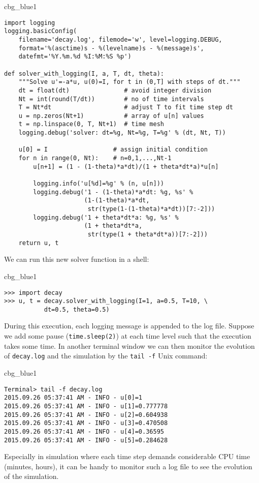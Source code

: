 \documentclass[graybox,sectrefs,envcountresetchap,open=right,final]{svmonodo}
\newenvironment{_cod_tight}[1]{
   \def\FrameCommand{\colorbox{#1}}
   \FrameRule0.6pt\MakeFramed {\FrameRestore}\vskip3mm}
   {\vskip0mm\endMakeFramed}
\newenvironment{cod}[1]{
\bgroup\rmfamily
\fboxsep=0mm\relax
\begin{_cod_tight}{#1}
\list{}{\parsep=-2mm\parskip=0mm\topsep=0pt\leftmargin=2mm
\rightmargin=2\leftmargin\leftmargin=4pt\relax}
\item\relax}
{\endlist\end{_cod_tight}\egroup}
\begin{document}
\begin{cod}{cbg_blue1}\begin{Verbatim}[numbers=none,fontsize=\fontsize{9pt}{9pt},baselinestretch=0.95,xleftmargin=2mm]
import logging
logging.basicConfig(
    filename='decay.log', filemode='w', level=logging.DEBUG,
    format='%(asctime)s - %(levelname)s - %(message)s',
    datefmt='%Y.%m.%d %I:%M:%S %p')

def solver_with_logging(I, a, T, dt, theta):
    """Solve u'=-a*u, u(0)=I, for t in (0,T] with steps of dt."""
    dt = float(dt)               # avoid integer division
    Nt = int(round(T/dt))        # no of time intervals
    T = Nt*dt                    # adjust T to fit time step dt
    u = np.zeros(Nt+1)           # array of u[n] values
    t = np.linspace(0, T, Nt+1)  # time mesh
    logging.debug('solver: dt=%g, Nt=%g, T=%g' % (dt, Nt, T))

    u[0] = I                  # assign initial condition
    for n in range(0, Nt):    # n=0,1,...,Nt-1
        u[n+1] = (1 - (1-theta)*a*dt)/(1 + theta*dt*a)*u[n]

        logging.info('u[%d]=%g' % (n, u[n]))
        logging.debug('1 - (1-theta)*a*dt: %g, %s' %
                      (1-(1-theta)*a*dt,
                       str(type(1-(1-theta)*a*dt))[7:-2]))
        logging.debug('1 + theta*dt*a: %g, %s' %
                      (1 + theta*dt*a,
                       str(type(1 + theta*dt*a))[7:-2]))
    return u, t
\end{Verbatim}
\end{cod}
\noindent
We can run this new solver function in a shell:

\begin{cod}{cbg_blue1}\begin{Verbatim}[numbers=none,fontsize=\fontsize{9pt}{9pt},baselinestretch=0.95,xleftmargin=2mm]
>>> import decay
>>> u, t = decay.solver_with_logging(I=1, a=0.5, T=10, \ 
           dt=0.5, theta=0.5)
\end{Verbatim}
\end{cod}
\noindent
During this execution, each logging message is appended to the log file.
Suppose we add some pause (\texttt{time.sleep(2)}) at each time level such that
the execution takes some time. In another terminal window we can then
monitor the evolution of \texttt{decay.log} and the simulation
by the \texttt{tail -f} Unix command:

\begin{cod}{cbg_blue1}\begin{Verbatim}[numbers=none,fontsize=\fontsize{9pt}{9pt},baselinestretch=0.95,xleftmargin=2mm]
Terminal> tail -f decay.log
2015.09.26 05:37:41 AM - INFO - u[0]=1
2015.09.26 05:37:41 AM - INFO - u[1]=0.777778
2015.09.26 05:37:41 AM - INFO - u[2]=0.604938
2015.09.26 05:37:41 AM - INFO - u[3]=0.470508
2015.09.26 05:37:41 AM - INFO - u[4]=0.36595
2015.09.26 05:37:41 AM - INFO - u[5]=0.284628
\end{Verbatim}
\end{cod}
\noindent
Especially in simulation where each time step demands considerable
CPU time (minutes, hours), it can be handy to monitor such a log file
to see the evolution of the simulation.
\end{document}
